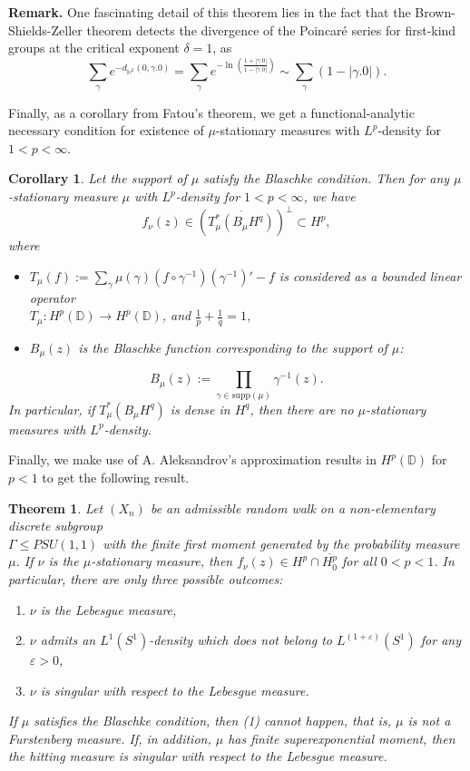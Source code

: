 \documentclass[11pt]{article}
\newtheorem{theorem}{Theorem}[section]
\newtheorem{corollary}{Corollary}[section]
\begin{document}
\textbf{Remark.} One fascinating detail of this theorem lies in the fact that the Brown-Shields-Zeller theorem detects the divergence of the Poincar\'e series for first-kind groups at the critical exponent $\delta = 1$, as
\[
\sum_{\gamma} e^{- d_{\mathbb{H}^2}(0, \gamma.0)} = \sum_{\gamma} e^{-\ln\left( \frac{1 + |\gamma.0|}{1 - |\gamma.0|} \right)} \sim \sum_{\gamma} (1 - |\gamma.0|).
\]

Finally, as a corollary from Fatou's theorem, we get a functional-analytic necessary condition for existence of $\mu$-stationary measures with $L^p$-density for $1 < p < \infty$.

\begin{corollary}
	\label{functional-analytic necessary condition}
	Let the support of $\mu$ satisfy the Blaschke condition. Then for any $\mu$-stationary measure $\mu$ with $L^p$-density for $1 < p < \infty$, we have
	\[
	f_\nu(z) \in (\overline{T_\mu^*(B_\mu H^q)})^{\perp} \subset H^p,
	\]
	where
	\begin{itemize}
		\item $T_\mu(f) := \sum_{\gamma} \mu(\gamma) (f \circ \gamma^{-1}) (\gamma^{-1})' - f$ is considered as a bounded linear operator \\ $T_\mu : H^p(\mathbb{D}) \rightarrow H^p(\mathbb{D})$, and $\frac{1}{p} + \frac{1}{q} = 1$,
		\item $B_\mu(z)$ is the Blaschke function corresponding to the support of $\mu$:
	\end{itemize}
	\[
	B_\mu(z) := \prod_{\gamma \in \text{supp}(\mu)} \gamma^{-1}(z).
	\]
	In particular, if $T_\mu^*(B_\mu H^q)$ is dense in $H^q$, then there are no $\mu$-stationary measures with $L^p$-density.
\end{corollary}

Finally, we make use of A. Aleksandrov's approximation results in $H^p(\mathbb{D})$ for $p < 1$ to get the following result.

\begin{theorem}
	\label{intro: singularity conjecture}
	Let $(X_n)$ be an admissible random walk on a non-elementary discrete subgroup \\ $\Gamma \leq PSU(1,1)$ with the finite first moment generated by the probability measure $\mu$. If $\nu$ is the $\mu$-stationary measure, then $f_\nu(z) \in H^p \cap \overline{H^p_0}$ for all $0 < p < 1$. In particular, there are only three possible outcomes:
	\begin{enumerate}[label=(\arabic*)]
		\item $\nu$ is the Lebesgue measure,
		\item $\nu$ admits an $L^1(S^1)$-density which does not belong to $L^{(1+\varepsilon)}(S^1)$ for any $\varepsilon > 0$,
		\item $\nu$ is singular with respect to the Lebesgue measure.
	\end{enumerate}
	If $\mu$ satisfies the Blaschke condition, then (1) cannot happen, that is, $\mu$ is not a Furstenberg measure. If, in addition, $\mu$ has finite superexponential moment, then the hitting measure is singular with respect to the Lebesgue measure.
\end{theorem}
\end{document}
